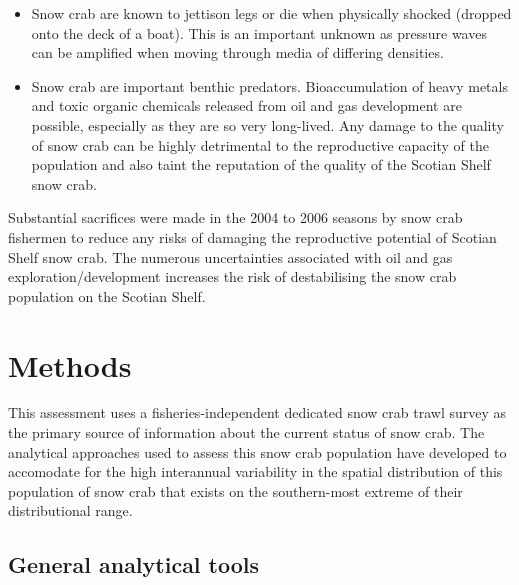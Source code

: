 \documentclass[11pt]{article}
\begin{document}
\begin{itemize}
\item Snow crab are known to jettison legs or die when physically shocked (dropped onto the deck of a boat). This is an important unknown as pressure waves can be amplified when moving through media of differing densities.

\item Snow crab are important benthic predators. Bioaccumulation of heavy metals and toxic organic chemicals released from oil and gas development are possible, especially as they are so very long-lived. Any damage to the quality of snow crab can be highly detrimental to the reproductive capacity of the population and also taint the reputation of the quality of the Scotian Shelf snow crab.


\end{itemize}

Substantial sacrifices were made in the 2004 to 2006 seasons by snow crab fishermen to reduce any risks of damaging the reproductive potential of Scotian Shelf snow crab. The numerous uncertainties associated with oil and gas exploration/development increases the risk of destabilising the snow crab population on the Scotian Shelf.


\section{Methods}

This assessment uses a fisheries-independent dedicated snow crab trawl survey as the primary source of information about the current status of snow crab. The analytical approaches used to assess this snow crab population have developed to accomodate for the high interannual variability in the spatial distribution of this population of snow crab that exists on the southern-most extreme of their distributional range.

\subsection{General analytical tools}
\end{document}
